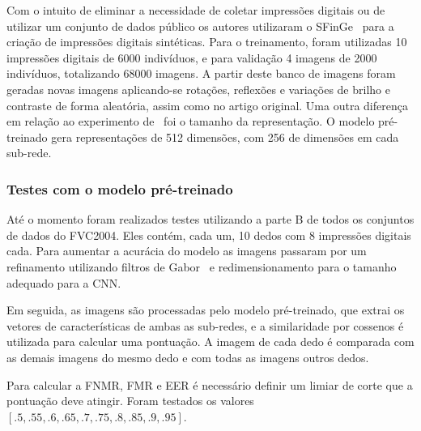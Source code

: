 Com o intuito de eliminar a necessidade de coletar impressões digitais ou de utilizar um conjunto de dados público os autores utilizaram o SFinGe~\cite{handbook_of_fp_recognition} para a criação de impressões digitais sintéticas. Para o treinamento, foram utilizadas 10 impressões digitais de 6000 indivíduos, e para validação 4 imagens de 2000 indivíduos, totalizando 68000 imagens. A partir deste banco de imagens foram geradas novas imagens aplicando-se rotações, reflexões e variações de brilho e contraste de forma aleatória, assim como no artigo original. Uma outra diferença em relação ao experimento de~ foi o tamanho da representação. O modelo pré-treinado gera representações de 512 dimensões, com 256 de dimensões em cada sub-rede.  


\subsubsection{Testes com o modelo pré-treinado}\label{subsubsec:deepprint-testing}

Até o momento foram realizados testes utilizando a parte B de todos os conjuntos de dados do FVC2004. Eles contém, cada um, 10 dedos com 8 impressões digitais cada. Para aumentar a acurácia do modelo as imagens passaram por um refinamento utilizando filtros de Gabor~\cite{gabor-wavelet-transform} e redimensionamento para o tamanho adequado para a CNN.

Em seguida, as imagens são processadas pelo modelo pré-treinado, que extrai os vetores de características de ambas as sub-redes, e a similaridade por cossenos é utilizada para calcular uma pontuação. A imagem de cada dedo é comparada com as demais imagens do mesmo dedo e com todas as imagens outros dedos.

Para calcular a FNMR, FMR e EER é necessário definir um limiar de corte que a pontuação deve atingir. Foram testados os valores $[.5, .55, .6, .65, .7, .75, .8, .85, .9, .95]$.
